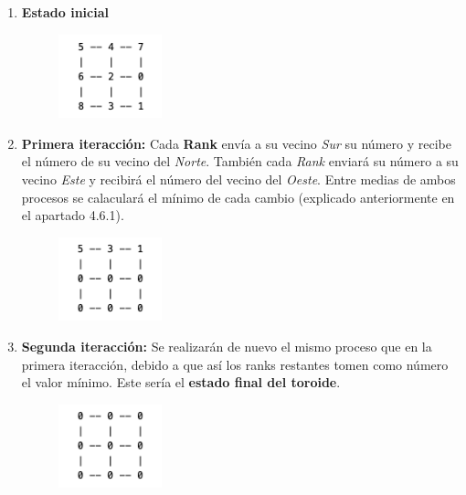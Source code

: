\documentclass[11pt]{article}
\newif\ifspanish %
\begin{document}
\begin{enumerate}
	\item \textbf{Estado inicial}
	\begin{figure}[H]
		\centering
		\includegraphics[width=30mm]{matriz-1.png}
		\label{fig:matriz-1}
	\end{figure}
	
	\item \textbf{Primera iteracción:} Cada \textbf{Rank} envía a su vecino \textit{Sur} su número y recibe el número de su vecino del \textit{Norte}. También cada \textit{Rank} enviará su número a su vecino \textit{Este} y recibirá el número del vecino del \textit{Oeste}. Entre medias de ambos procesos se calaculará el mínimo de cada cambio (explicado anteriormente en el apartado 4.6.1).
	\begin{figure}[H]
	\centering
	\includegraphics[width=30mm]{matriz-2.png}
	\label{fig:matriz-2}
	\end{figure}

	\item \textbf{Segunda iteracción:} Se realizarán de nuevo el mismo proceso que en la primera iteracción, debido a que así los ranks restantes tomen como número el valor mínimo. Este sería el \textbf{estado final del toroide}.
		\begin{figure}[H]
		\centering
		\includegraphics[width=30mm]{matriz-3.png}
		\label{fig:matriz-3}
		\end{figure}
	

\end{enumerate}







\newpage




\ifspanish
	\addcontentsline{toc}{section}{Referencias}
\else
\fi
\end{document}
